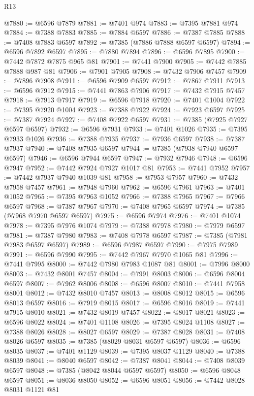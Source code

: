 \begin{lexlean}{R13}
\begin{coremodule}
@7880 := @6596 @7879
@7881 := @7401 @974
@7883 := @7395 @7881 @974
@7884 := @7388 @7883
@7885 := @7884 @6597
@7886 := @7387 @7885
@7888 := @7408 @7883 @6597
@7892 := @7385 (@7886 @7888 @6597 @6597)
@7894 := @6596 @7892 @6597
@7895 := @7880 @7894
@7896 := @6596 @7895
@7900 := @7442 @7872 @7875 @965 @81
@7901 := @7441 @7900
@7905 := @7442 @7885 @7888 @987 @81
@7906 := @7901 @7905
@7908 := @7432 @7906 @7457
@7909 := @7896 @7908
@7911 := @6596 @7909 @6597
@7912 := @7867 @7911
@7913 := @6596 @7912
@7915 := @7441 @7863 @7906
@7917 := @7432 @7915 @7457
@7918 := @7913 @7917
@7919 := @6596 @7918
@7920 := @7401 @1004
@7922 := @7395 @7920 @1004
@7923 := @7388 @7922
@7924 := @7923 @6597
@7925 := @7387 @7924
@7927 := @7408 @7922 @6597
@7931 := @7385 (@7925 @7927 @6597 @6597)
@7932 := @6596 @7931
@7933 := @7401 @1026
@7935 := @7395 @7933 @1026
@7936 := @7388 @7935
@7937 := @7936 @6597
@7938 := @7387 @7937
@7940 := @7408 @7935 @6597
@7944 := @7385 (@7938 @7940 @6597 @6597)
@7946 := @6596 @7944 @6597
@7947 := @7932 @7946
@7948 := @6596 @7947
@7952 := @7442 @7924 @7927 @1017 @81
@7953 := @7441 @7952
@7957 := @7442 @7937 @7940 @1039 @81
@7958 := @7953 @7957
@7960 := @7432 @7958 @7457
@7961 := @7948 @7960
@7962 := @6596 @7961
@7963 := @7401 @1052
@7965 := @7395 @7963 @1052
@7966 := @7388 @7965
@7967 := @7966 @6597
@7968 := @7387 @7967
@7970 := @7408 @7965 @6597
@7974 := @7385 (@7968 @7970 @6597 @6597)
@7975 := @6596 @7974
@7976 := @7401 @1074
@7978 := @7395 @7976 @1074
@7979 := @7388 @7978
@7980 := @7979 @6597
@7981 := @7387 @7980
@7983 := @7408 @7978 @6597
@7987 := @7385 (@7981 @7983 @6597 @6597)
@7989 := @6596 @7987 @6597
@7990 := @7975 @7989
@7991 := @6596 @7990
@7995 := @7442 @7967 @7970 @1065 @81
@7996 := @7441 @7995
@8000 := @7442 @7980 @7983 @1087 @81
@8001 := @7996 @8000
@8003 := @7432 @8001 @7457
@8004 := @7991 @8003
@8006 := @6596 @8004 @6597
@8007 := @7962 @8006
@8008 := @6596 @8007
@8010 := @7441 @7958 @8001
@8012 := @7432 @8010 @7457
@8013 := @8008 @8012
@8015 := @6596 @8013 @6597
@8016 := @7919 @8015
@8017 := @6596 @8016
@8019 := @7441 @7915 @8010
@8021 := @7432 @8019 @7457
@8022 := @8017 @8021
@8023 := @6596 @8022
@8024 := @7401 @1108
@8026 := @7395 @8024 @1108
@8027 := @7388 @8026
@8028 := @8027 @6597
@8029 := @7387 @8028
@8031 := @7408 @8026 @6597
@8035 := @7385 (@8029 @8031 @6597 @6597)
@8036 := @6596 @8035
@8037 := @7401 @1129
@8039 := @7395 @8037 @1129
@8040 := @7388 @8039
@8041 := @8040 @6597
@8042 := @7387 @8041
@8044 := @7408 @8039 @6597
@8048 := @7385 (@8042 @8044 @6597 @6597)
@8050 := @6596 @8048 @6597
@8051 := @8036 @8050
@8052 := @6596 @8051
@8056 := @7442 @8028 @8031 @1121 @81

\end{coremodule}
\end{lexlean}
